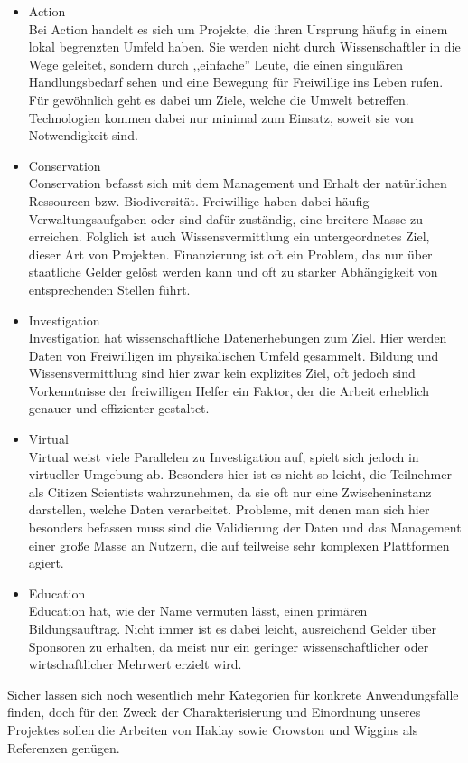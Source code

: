 \documentclass{article}
\begin{document}
\begin{itemize}
\item{Action\\
Bei Action handelt es sich um Projekte, die ihren Ursprung häufig in einem lokal begrenzten Umfeld haben.
Sie werden nicht durch Wissenschaftler in die Wege geleitet,
sondern durch ,,einfache'' Leute, die einen singulären Handlungsbedarf sehen und eine Bewegung für Freiwillige ins Leben rufen.
Für gewöhnlich geht es dabei um Ziele, welche die Umwelt betreffen.
Technologien kommen dabei nur minimal zum Einsatz, soweit sie von Notwendigkeit sind.}
\item{Conservation\\
Conservation befasst sich mit dem Management und Erhalt der natürlichen Ressourcen bzw. Biodiversität.
Freiwillige haben dabei häufig Verwaltungsaufgaben oder sind dafür zuständig, eine breitere Masse zu erreichen.
Folglich ist auch Wissensvermittlung ein untergeordnetes Ziel, dieser Art von Projekten.
Finanzierung ist oft ein Problem, das nur über staatliche Gelder gelöst werden kann und oft
zu starker Abhängigkeit von entsprechenden Stellen führt.}
\item{Investigation\\
Investigation hat wissenschaftliche Datenerhebungen zum Ziel.
Hier werden Daten von Freiwilligen im physikalischen Umfeld gesammelt.
Bildung und Wissensvermittlung sind hier zwar kein explizites Ziel, oft jedoch sind Vorkenntnisse der freiwilligen Helfer ein Faktor,
der die Arbeit erheblich genauer und effizienter gestaltet.}
\item{Virtual\\
Virtual weist viele Parallelen zu Investigation auf, spielt sich jedoch in virtueller Umgebung ab.
Besonders hier ist es nicht so leicht, die Teilnehmer als Citizen Scientists wahrzunehmen, da sie oft nur eine Zwischeninstanz darstellen,
welche Daten verarbeitet.
Probleme, mit denen man sich hier besonders befassen muss sind die Validierung der Daten und das Management
einer große Masse an Nutzern, die auf teilweise sehr komplexen Plattformen agiert.}
\item{Education\\
Education hat, wie der Name vermuten lässt, einen primären Bildungsauftrag.
Nicht immer ist es dabei leicht, ausreichend Gelder über Sponsoren zu erhalten, da meist nur ein geringer wissenschaftlicher oder
wirtschaftlicher Mehrwert erzielt wird.}
\end{itemize}
Sicher lassen sich noch wesentlich mehr Kategorien für konkrete Anwendungsfälle finden,
doch für den Zweck der Charakterisierung und Einordnung unseres Projektes sollen die Arbeiten von Haklay sowie Crowston und Wiggins
als Referenzen genügen.
\end{document}
